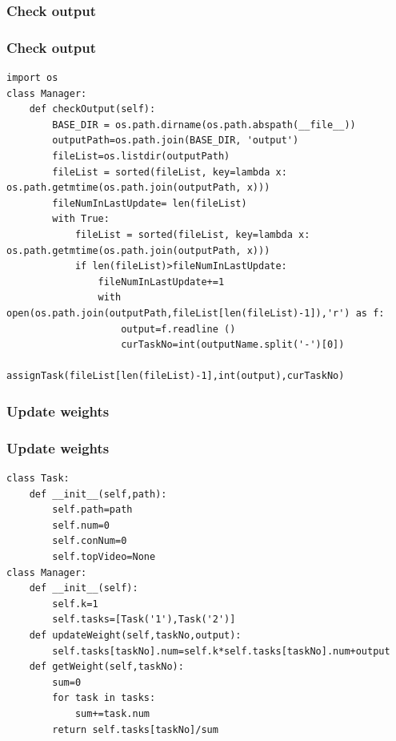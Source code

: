 \documentclass{beamer}
\begin{document}
\subsubsection{Check output}
\begin{frame}[fragile]
    \frametitle{Check output} 
\begin{lstlisting}[basicstyle=\ttfamily\tiny]
import os
class Manager:              
    def checkOutput(self):
        BASE_DIR = os.path.dirname(os.path.abspath(__file__))
        outputPath=os.path.join(BASE_DIR, 'output')
        fileList=os.listdir(outputPath)
        fileList = sorted(fileList, key=lambda x: os.path.getmtime(os.path.join(outputPath, x)))
        fileNumInLastUpdate= len(fileList)
        with True:
            fileList = sorted(fileList, key=lambda x: os.path.getmtime(os.path.join(outputPath, x)))
            if len(fileList)>fileNumInLastUpdate:
                fileNumInLastUpdate+=1
                with open(os.path.join(outputPath,fileList[len(fileList)-1]),'r') as f:
                    output=f.readline ()
                    curTaskNo=int(outputName.split('-')[0])
                    assignTask(fileList[len(fileList)-1],int(output),curTaskNo)
\end{lstlisting}
\end{frame}

\subsubsection{Update weights}
\begin{frame}[fragile]
    \frametitle{Update weights} 
\begin{lstlisting}[basicstyle=\tiny]
class Task:
    def __init__(self,path):
        self.path=path
        self.num=0
        self.conNum=0
        self.topVideo=None
class Manager:
    def __init__(self):
        self.k=1
        self.tasks=[Task('1'),Task('2')]
    def updateWeight(self,taskNo,output):
        self.tasks[taskNo].num=self.k*self.tasks[taskNo].num+output
    def getWeight(self,taskNo):
        sum=0
        for task in tasks:
            sum+=task.num
        return self.tasks[taskNo]/sum
\end{lstlisting}
\end{frame}
\end{document}
